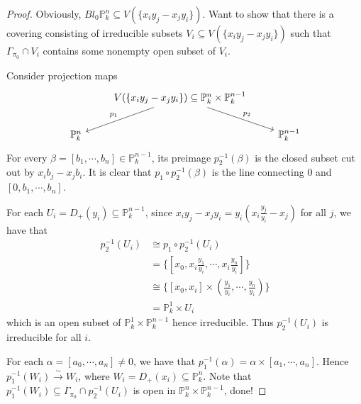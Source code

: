 \documentclass{ctexart}
\begin{document}
\begin{proof}
    Obviously, $Bl_{0}\mathbb{P}_{k}^{n} \subseteq V(\{x_{i}y_{j} - x_{j}y_{i}\})$.
    Want to show that there is a covering consisting of irreducible subsets $V_{i} \subseteq V(\{x_{i}y_{j} - x_{j}y_{i}\})$ such that $\Gamma_{\pi_{0}} \cap V_{i}$ contains some nonempty open subset of $V_{i}$.
    \par
    Consider projection maps
    \begin{equation}
        \begin{tikzcd} 
            & V(\{x_{i}y_{j} - x_{j}y_{i}\}) \subseteq \mathbb{P}_{k}^{n} \times \mathbb{P}_{k}^{n - 1} \arrow[dr, "p_{2}"] \arrow[dl, "p_{1}" swap] & \\
            \mathbb{P}_{k}^{n} && \mathbb{P}_{k}^{n - 1}
        \end{tikzcd}
    \end{equation}
    For every $\beta = [b_{1}, \cdots, b_{n}]\in \mathbb{P}_{k}^{n - 1}$, 
    its preimage $p_{2}^{-1}(\beta)$ is the closed subset cut out by $x_{i}b_{j} - x_{j}b_{i}$.
    It is clear that $p_{1} \circ p_{2}^{-1}(\beta)$ is the line connecting $0$ and $[0, b_{1}, \cdots, b_{n}]$.
    \par
    For each $U_{i} = D_{+}(y_{i}) \subseteq \mathbb{P}_{k}^{n - 1}$, 
    since $x_{i}y_{j} - x_{j}y_{i} = y_{i}(x_{i}\frac{y_{j}}{y_{i}} - x_{j})$ for all $j$, we have that
    \begin{equation}
        \begin{split}
            p_{2}^{-1}(U_{i}) & \cong p_{1} \circ p_{2}^{-1}(U_{i}) \\
            & = \{[x_{0}, x_{i}\frac{y_{1}}{y_{i}}, \cdots, x_{i}\frac{y_{n}}{y_{i}}]\} \\
            & \cong \{[x_{0}, x_{i}] \times (\frac{y_{1}}{y_{i}}, \cdots, \frac{y_{n}}{y_{i}})\} \\
            & = \mathbb{P}_{k}^{1} \times U_{i}
        \end{split}
    \end{equation}
    which is an open subset of $\mathbb{P}_{k}^{1} \times \mathbb{P}_{k}^{n - 1}$ hence irreducible. 
    Thus $p_{2}^{-1}(U_{i})$ is irreducible for all $i$.
    \par
    For each $\alpha = [a_{0}, \cdots, a_{n}] \neq 0$, we have that $p_{1}^{-1}(\alpha) = \alpha \times [a_{1}, \cdots, a_{n}]$.
    Hence $p_{1}^{-1}(W_{i}) \overset{\sim}{\rightarrow} W_{i}$, where $W_{i} = D_{+}(x_{i}) \subseteq \mathbb{P}_{k}^{n}$.
    Note that $p_{1}^{-1}(W_{i}) \subseteq \Gamma_{\pi_{0}} \cap p_{2}^{-1}(U_{i})$ is open in $\mathbb{P}_{k}^{n} \times \mathbb{P}_{k}^{n - 1}$, done!
\end{proof}
\end{document}
